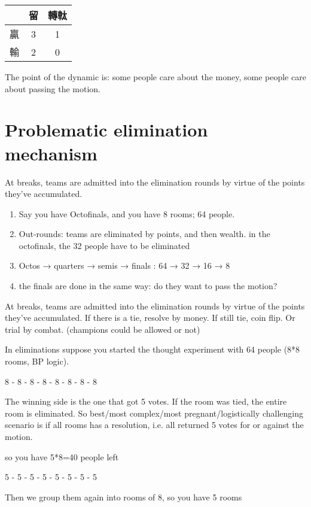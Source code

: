 \documentclass[9pt]{article}
\begin{document}
\begin{table}[h]
\centering
\begin{tabular}{l|cc}
\toprule
 & 留 & 轉軚 \\
\midrule
贏 & 3 & 1 \\
輸 & 2 & 0 \\
\bottomrule
\end{tabular}
\end{table}

The point of the dynamic is: some people care about the money, some people care about passing the motion.

\section{Problematic elimination mechanism}

At breaks, teams are admitted into the elimination rounds by virtue of the points they've accumulated.

\begin{enumerate}
    \item Say you have Octofinals, and you have 8 rooms; 64 people.
    \item Out-rounds: teams are eliminated by points, and then wealth. in the octofinals, the 32 people have to be eliminated
    \item Octos → quarters → semis → finals : 64 → 32 → 16 → 8
    \item the finals are done in the same way: do they want to pass the motion?
\end{enumerate}

At breaks, teams are admitted into the elimination rounds by virtue of the points they've accumulated. If there is a tie, resolve by money. If still tie, coin flip. Or trial by combat. (champions could be allowed or not)

In eliminations suppose you started the thought experiment with 64 people (8*8 rooms, BP logic).

8 - 8 - 8 - 8 - 8 - 8 - 8 - 8

The winning side is the one that got 5 votes. If the room was tied, the entire room is eliminated. So best/most complex/most pregnant/logistically challenging scenario is if all rooms has a resolution, i.e. all returned 5 votes for or against the motion.

so you have 5*8=40 people left

5 - 5 - 5 - 5 - 5 - 5 - 5 - 5

Then we group them again into rooms of 8, so you have 5 rooms
\end{document}
